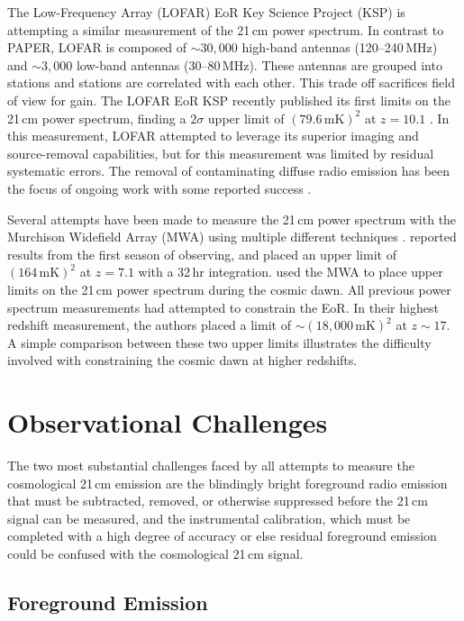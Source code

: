 \begin{bibunit}
The Low-Frequency Array (LOFAR) EoR Key Science Project (KSP) is attempting a similar measurement of
the 21\,cm power spectrum. In contrast to PAPER, LOFAR is composed of $\sim30,000$ high-band
antennas (120--240\,MHz) and $\sim3,000$ low-band antennas (30--80\,MHz). These antennas are grouped
into stations and stations are correlated with each other. This trade off sacrifices field of view
for gain. The LOFAR EoR KSP recently published its first limits on the 21\,cm power spectrum,
finding a $2\sigma$ upper limit of $(79.6\,\text{mK})^2$ at $z=10.1$ \citep{2017ApJ...838...65P}. In
this measurement, LOFAR attempted to leverage its superior imaging and source-removal capabilities,
but for this measurement was limited by residual systematic errors. The removal of contaminating
diffuse radio emission has been the focus of ongoing work with some reported success
\citep{koopmans_2017}.

Several attempts have been made to measure the 21\,cm power spectrum with the Murchison Widefield
Array (MWA) using multiple different techniques \citep{2016ApJ...825..114J}.
\citet{2016ApJ...833..102B} reported results from the first season of observing, and placed an upper
limit of $(164\,\text{mK})^2$ at $z=7.1$ with a 32\,hr integration.  \citet{2016MNRAS.460.4320E}
used the MWA to place upper limits on the 21\,cm power spectrum during the cosmic dawn. All previous
power spectrum measurements had attempted to constrain the EoR. In their highest redshift
measurement, the authors placed a limit of $\sim (18,000\,\text{mK})^2$ at $z\sim 17$. A simple
comparison between these two upper limits illustrates the difficulty involved with constraining the
cosmic dawn at higher redshifts.

\section{Observational Challenges}

The two most substantial challenges faced by all attempts to measure the cosmological 21\,cm
emission are the blindingly bright foreground radio emission that must be subtracted, removed, or
otherwise suppressed before the 21\,cm signal can be measured, and the instrumental calibration,
which must be completed with a high degree of accuracy or else residual foreground emission could be
confused with the cosmological 21\,cm signal.

\subsection{Foreground Emission}


\end{bibunit}
